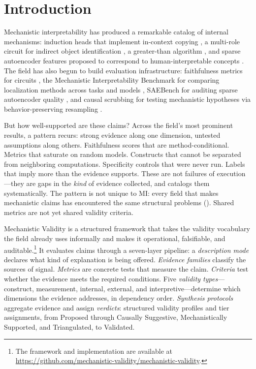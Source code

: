 \documentclass{article}
\begin{document}
\section{Introduction}
\label{sec:intro}

Mechanistic interpretability has produced a remarkable catalog of internal mechanisms:
induction heads that implement in-context copying \citep{olsson2022context}, a multi-role
circuit for indirect object identification \citep{wang2023interpretability}, a greater-than
algorithm \citep{hanna2023greater}, and sparse autoencoder features proposed to correspond
to human-interpretable concepts \citep{cunningham2023sparse, bricken2024monosemanticity}. The field has also begun to
build evaluation infrastructure: faithfulness metrics for circuits
\citep{miller2024transformer}, the Mechanistic Interpretability Benchmark for comparing
localization methods across tasks and models \citep{mueller2025mib}, SAEBench for auditing
sparse autoencoder quality \citep{karvonen2025saebench}, and causal scrubbing for testing
mechanistic hypotheses via behavior-preserving resampling \citep{chan2022causal}.

But how well-supported are these claims? Across the field's most prominent results, a pattern recurs: strong evidence along one dimension, untested assumptions along others. Faithfulness scores that are method-conditional. Metrics that saturate on random models. Constructs that cannot be separated from neighboring computations. Specificity controls that were never run. Labels that imply more than the evidence supports. These are not failures of execution---they are gaps in the \emph{kind} of evidence collected, and  catalogs them systematically. The pattern is not unique to MI: every field that makes mechanistic claims has encountered the same structural problems (). Shared metrics are not yet shared validity criteria.

Mechanistic Validity is a structured framework that takes the validity vocabulary the field already uses informally and makes it operational, falsifiable, and auditable.\footnote{The framework and implementation are available at \url{https://github.com/mechanistic-validity/mechanistic-validity}.} It evaluates claims through a seven-layer pipeline: a \emph{description mode} declares what kind of explanation is being offered. \emph{Evidence families} classify the sources of signal. \emph{Metrics} are concrete tests that measure the claim. \emph{Criteria} test whether the evidence meets the required conditions. Five \emph{validity types}---construct, measurement, internal, external, and interpretive---determine which dimensions the evidence addresses, in dependency order. \emph{Synthesis protocols} aggregate evidence and assign \emph{verdicts}: structured validity profiles and tier assignments, from Proposed through Causally Suggestive, Mechanistically Supported, and Triangulated, to Validated.
\end{document}

